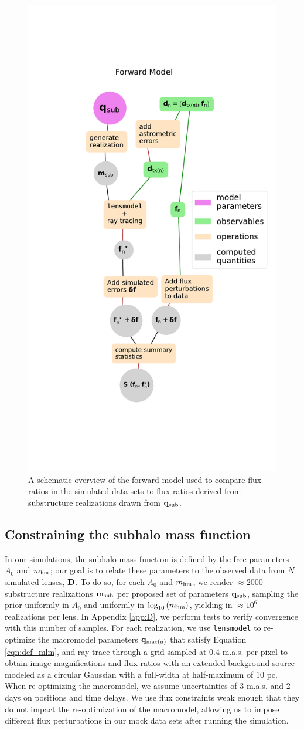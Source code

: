 \begin{figure}
	\centering
	\includegraphics[clip,trim=4cm 5cm .5cm
	5cm,width=.6\textwidth,keepaspectratio]{./figures_ABCforward/forward_model_graph.pdf}
	\caption{\label{fig:visualization} A schematic overview of the forward model used to compare flux ratios in the simulated data sets to flux ratios derived from substructure realizations drawn from ${\bf{q}_{\rm{sub}}}$.}  
\end{figure}
\subsection{Constraining the subhalo mass function}
\label{ssec:to_posterior}
In our simulations, the subhalo mass function is defined by the free parameters $A_0$ and $m_{\rm{hm}}$; our goal is to relate these parameters to the observed data from $N$ simulated lenses, $\bf{D}$. To do so, for each $A_0$ and $m_{\rm{hm}}$, we render $\approx 2000$ substructure realizations ${\bf{m}_{\rm{sub}}}$ per proposed set of parameters ${\bf{q}_{\rm{sub}}}$, sampling the prior uniformly in $A_0$ and uniformly in $\log_{10}\left(m_{\rm{hm}}\right)$, yielding in $\approx 10^6$ realizations per lens. In Appendix \ref{app:D}, we perform tests to verify convergence with this number of samples. For each realization, we use {\tt{lensmodel}} to re-optimize the macromodel parameters ${\bf{q}_{\rm{mac(n)}}}$ that satisfy Equation \ref{eqn:def_mlm}, and ray-trace through a grid sampled at 0.4 m.a.s. per pixel to obtain image magnifications and flux ratios with an extended background source modeled as a circular Gaussian with a full-width at half-maximum of $10$ pc. When re-optimizing the macromodel, we assume uncertainties of 3 m.a.s. and 2 days on positions and time delays. We use flux constraints weak enough that they do not impact the re-optimization of the macromodel, allowing us to impose different flux perturbations in our mock data sets after running the simulation. 

